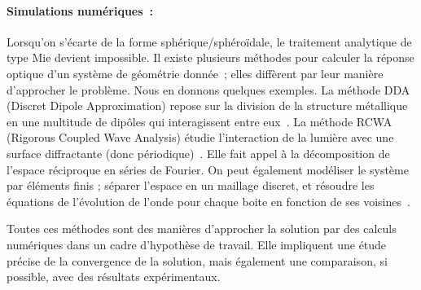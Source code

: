 \paragraph*{Simulations numériques~:}
Lorsqu'on s'écarte de la forme sphérique/sphéroïdale, le traitement analytique de type Mie devient impossible. Il existe plusieurs méthodes pour calculer la réponse optique d'un système de géométrie donnée~; elles diffèrent par leur manière d'approcher le problème. Nous en donnons quelques exemples. La méthode DDA (Discret Dipole Approximation) repose sur la division de la structure métallique en une multitude de dipôles qui interagissent entre eux~\cite{draine1994discrete}. La méthode RCWA (Rigorous Coupled Wave Analysis) étudie l'interaction de la lumière avec une surface diffractante (donc périodique)~\cite{moharam1981rigorous}. Elle fait appel à la décomposition de l'espace réciproque en séries de Fourier. On peut également modéliser le système par éléments finis ; séparer l'espace en un maillage discret, et résoudre les équations de l'évolution de l'onde pour chaque boite en fonction de ses voisines~\cite{jin2015finite}.\par 
Toutes ces méthodes sont des manières d'approcher la solution par des calculs numériques dans un cadre d'hypothèse de travail. Elle impliquent une étude précise de la convergence de la solution, mais également une comparaison, si possible, avec des résultats expérimentaux.\par 

